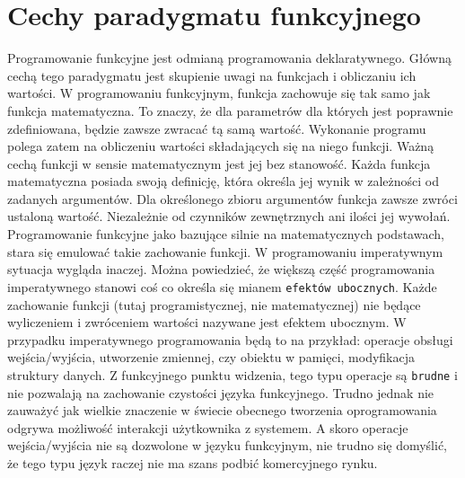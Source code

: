 \documentclass[a4paper,10pt]{report}
\begin{document}
\section{Cechy paradygmatu funkcyjnego}
Programowanie funkcyjne jest odmianą programowania deklaratywnego. Główną cechą tego paradygmatu jest skupienie uwagi na funkcjach i obliczaniu ich wartości. W programowaniu funkcyjnym, funkcja zachowuje się tak samo jak funkcja matematyczna. To znaczy, że dla parametrów dla których jest poprawnie zdefiniowana, będzie zawsze zwracać tą samą wartość. Wykonanie programu polega zatem na obliczeniu wartości składających się na niego funkcji.
Ważną cechą funkcji w sensie matematycznym jest jej bez stanowość. Każda funkcja matematyczna posiada swoją definicję, która określa jej wynik w zależności od zadanych argumentów. Dla określonego zbioru argumentów funkcja zawsze zwróci ustaloną wartość. Niezależnie od czynników zewnętrznych ani ilości jej wywołań. Programowanie funkcyjne jako bazujące silnie na matematycznych podstawach, stara się emulować takie zachowanie funkcji. W programowaniu imperatywnym sytuacja wygląda inaczej. Można powiedzieć, że większą część programowania imperatywnego stanowi coś co określa się mianem \verb|efektów ubocznych|. Każde zachowanie funkcji (tutaj programistycznej, nie matematycznej) nie będące wyliczeniem i zwróceniem wartości nazywane jest efektem ubocznym. W przypadku imperatywnego programowania będą to na przykład: operacje obsługi wejścia/wyjścia, utworzenie zmiennej, czy obiektu w pamięci, modyfikacja struktury danych. Z funkcyjnego punktu widzenia, tego typu operacje są \verb|brudne| i nie pozwalają na zachowanie czystości języka funkcyjnego. Trudno jednak nie zauważyć jak wielkie znaczenie w świecie obecnego tworzenia oprogramowania odgrywa możliwość interakcji użytkownika z systemem. A skoro operacje wejścia/wyjścia nie są dozwolone w języku funkcyjnym, nie trudno się domyślić, że tego typu język raczej nie ma szans podbić komercyjnego rynku.
\end{document}
